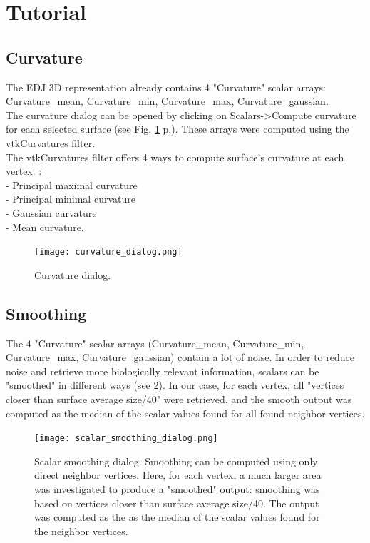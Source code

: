 \documentclass[12pt, a4paper]{book}
\begin{document}
\section{Tutorial}

\subsection{Curvature}
The EDJ 3D representation already contains 4 "Curvature" scalar arrays: Curvature\_mean, Curvature\_min, Curvature\_max, Curvature\_gaussian.\\ 
The curvature dialog can be opened by clicking on Scalars->Compute curvature for each selected surface (see Fig. \ref{curvature_dialog} p.\pageref{curvature_dialog}). These arrays were computed using the vtkCurvatures filter.\\
The vtkCurvatures filter offers 4 ways to compute surface's
curvature at each vertex. :\\
- Principal maximal curvature\\
- Principal minimal curvature\\
- Gaussian curvature\\
- Mean curvature.\\

\begin{figure}
  \centering
  \texttt{[image: curvature\_dialog.png]} 
	\caption{Curvature dialog.}
\label{curvature_dialog}
\end{figure}

\subsection{Smoothing}
The 4 "Curvature" scalar arrays (Curvature\_mean, Curvature\_min, Curvature\_max, Curvature\_gaussian) contain a lot of noise. In order to reduce noise and retrieve more biologically relevant information, scalars can be "smoothed" in different ways (see \ref{smoothing_scalars_dialog}). In our case, for each vertex, all "vertices closer than surface average size/40" were retrieved, and the smooth output was computed as the median of the scalar values found for all found neighbor vertices.

\begin{figure}
  \centering
  \texttt{[image: scalar\_smoothing\_dialog.png]} 
	\caption{ 
Scalar smoothing dialog. Smoothing can be computed using only direct neighbor vertices. Here, for each vertex, a much larger area was investigated to produce a "smoothed" output: smoothing was based on vertices closer than surface average size/40. The output was computed as the as the median of the scalar values found for the neighbor vertices.
	}
\label{smoothing_scalars_dialog}
\end{figure}
\end{document}
